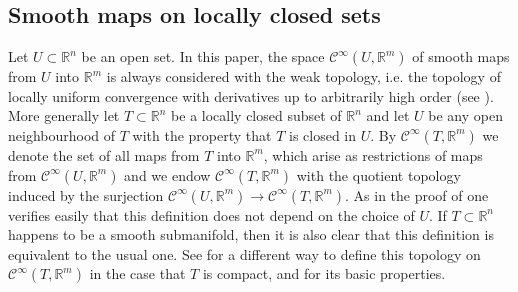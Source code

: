 \documentclass{amsart}
\theoremstyle{plain}
\theoremstyle{definition}
\theoremstyle{remark}
\numberwithin{equation}{thm} %
\newcommand{\R}{\mathbb{R}}
\begin{document}
\subsection{Smooth maps on locally closed sets}\label{sec:pre:smooth}
Let $U\subset \R^n$ be an open set. In this paper, the space $\mathcal C^\infty(U,\R^m)$ of smooth maps from $U$ into $\R^m$ is always considered with the weak topology, i.e. the topology of locally uniform convergence with derivatives up to arbitrarily high order (see \cite[p. 34]{hirschDifferentialTopology1976}). More generally let $T\subset \R^n$ be a locally closed subset of $\R^n$ and let $U$ be any open neighbourhood of $T$ with the property that $T$ is closed in $U$. By $\mathcal{C}^\infty(T,\R^m)$ we denote the set of all maps from $T$ into $\R^m$, which arise as restrictions of maps from $\mathcal{C}^\infty(U,\R^m)$ and we endow $\mathcal C^\infty(T,\R^m)$ with the quotient topology induced by the surjection $\mathcal{C}^\infty(U,\R^m)\rightarrow \mathcal{C}^\infty(T,\R^m)$. As in the proof of \cite[Claim 2.5]{bilskiApproximationPiecewiseregularMaps2020} one verifies easily that this definition does not depend on the choice of $U$. If $T\subset \R^n$ happens to be a smooth submanifold, then it is also clear that this definition is equivalent to the usual one. See \cite[Section 2.3.1]{bilskiApproximationPiecewiseregularMaps2020} for a different way to define this topology on $\mathcal C^\infty(T,\R^m)$ in the case that $T$ is compact, and for its basic properties. 
\end{document}
